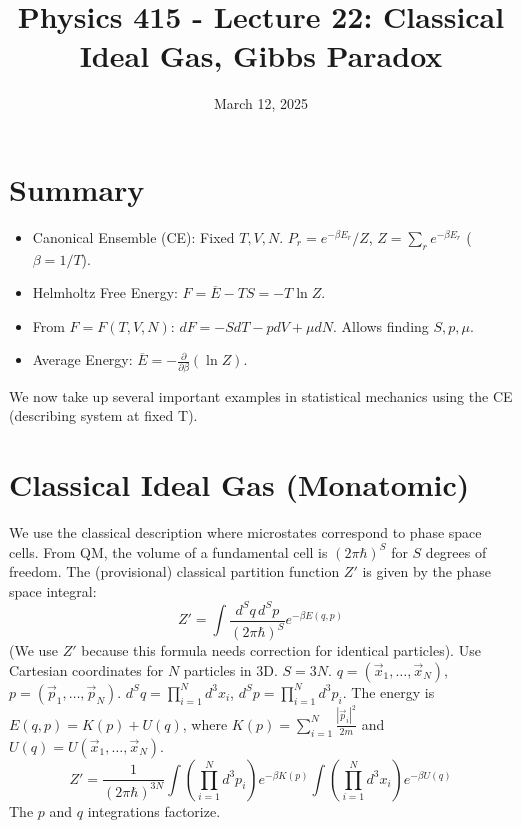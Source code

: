 \documentclass[11pt]{article}
\title{Physics 415 - Lecture 22: Classical Ideal Gas, Gibbs Paradox}
\date{March 12, 2025}
\author{} %
\newcommand{\avg}[1]{\overline{#1}}
\newcommand{\pderiv}[2]{\frac{\partial #1}{\partial #2}}
\newcommand{\partfn}{Z} %
\begin{document}
\maketitle
\thispagestyle{empty}

\section*{Summary}

\begin{itemize}
    \item Canonical Ensemble (CE): Fixed $T, V, N$. $P_r = e^{-\beta E_r} / \partfn$, $\partfn = \sum_r e^{-\beta E_r}$ ($\beta=1/T$).
    \item Helmholtz Free Energy: $F = \avg{E} - TS = -T \ln \partfn$.
    \item From $F=F(T,V,N)$: $dF = -S dT - p dV + \mu dN$. Allows finding $S, p, \mu$.
    \item Average Energy: $\avg{E} = -\pderiv{}{\beta} (\ln \partfn)$.
\end{itemize}

We now take up several important examples in statistical mechanics using the CE (describing system at fixed T).

\section*{Classical Ideal Gas (Monatomic)}

We use the classical description where microstates correspond to phase space cells. From QM, the volume of a fundamental cell is $(2\pi\hbar)^S$ for $S$ degrees of freedom.
The (provisional) classical partition function $Z'$ is given by the phase space integral:
\[ Z' = \int \frac{d^S q \, d^S p}{(2\pi\hbar)^S} e^{-\beta E(q,p)} \]
(We use $Z'$ because this formula needs correction for identical particles).
Use Cartesian coordinates for $N$ particles in 3D. $S=3N$.
$q = (\vec{x}_1, \dots, \vec{x}_N)$, $p = (\vec{p}_1, \dots, \vec{p}_N)$.
$d^S q = \prod_{i=1}^N d^3 x_i$, $d^S p = \prod_{i=1}^N d^3 p_i$.
The energy is $E(q,p) = K(p) + U(q)$, where $K(p) = \sum_{i=1}^N \frac{|\vec{p}_i|^2}{2m}$ and $U(q) = U(\vec{x}_1, \dots, \vec{x}_N)$.
\[ Z' = \frac{1}{(2\pi\hbar)^{3N}} \int \left( \prod_{i=1}^N d^3 p_i \right) e^{-\beta K(p)} \int \left( \prod_{i=1}^N d^3 x_i \right) e^{-\beta U(q)} \]
The $p$ and $q$ integrations factorize.
\end{document}
